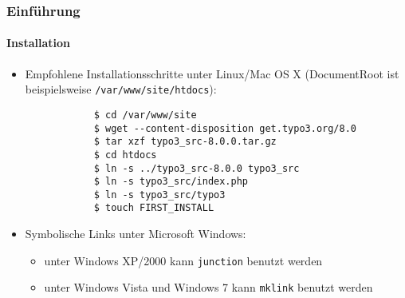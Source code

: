 \begin{frame}[fragile]
	\frametitle{Einführung}
	\framesubtitle{Installation}

	\begin{itemize}
		\item Empfohlene Installationsschritte unter Linux/Mac OS X\newline
			(DocumentRoot ist beispielsweise \texttt{/var/www/site/htdocs}):
		\begin{lstlisting}
			$ cd /var/www/site
			$ wget --content-disposition get.typo3.org/8.0
			$ tar xzf typo3_src-8.0.0.tar.gz
			$ cd htdocs
			$ ln -s ../typo3_src-8.0.0 typo3_src
			$ ln -s typo3_src/index.php
			$ ln -s typo3_src/typo3
			$ touch FIRST_INSTALL
		\end{lstlisting}

		\item Symbolische Links unter Microsoft Windows:

			\begin{itemize}
				\item unter Windows XP/2000 kann \texttt{junction} benutzt werden
				\item unter Windows Vista und Windows 7 kann \texttt{mklink} benutzt werden
			\end{itemize}

	\end{itemize}
\end{frame}

